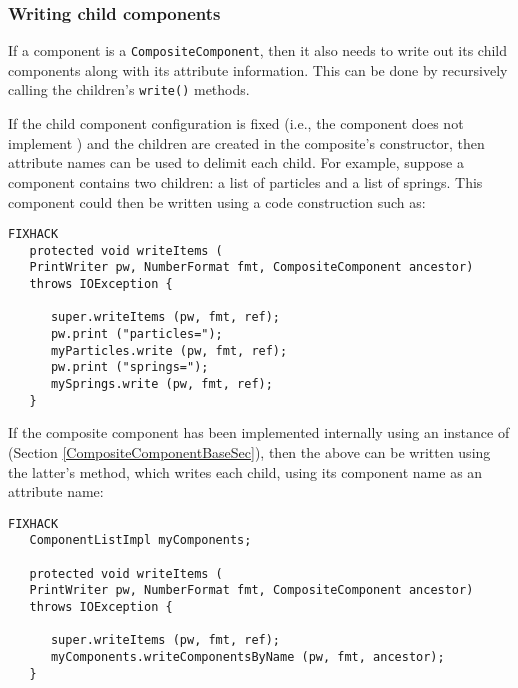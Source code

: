 \documentclass{article}
\begin{document}
\subsubsection{Writing child components}
\label{writingChildrenSec}

If a component is a {\tt CompositeComponent}, then it also needs to write
out its child components along with its attribute information. This
can be done by recursively calling the children's {\tt write()} methods.

If the child component configuration is fixed (i.e., the component
does not implement
)
and the children are created in the composite's constructor,
then attribute names can be used to delimit each child. For example, suppose
a component contains two children: a list of particles and a
list of springs. This component could then be written using
a code construction such as:
\begin{lstlisting}FIXHACK
   protected void writeItems (
   PrintWriter pw, NumberFormat fmt, CompositeComponent ancestor) 
   throws IOException {

      super.writeItems (pw, fmt, ref);
      pw.print ("particles=");
      myParticles.write (pw, fmt, ref);
      pw.print ("springs=");
      mySprings.write (pw, fmt, ref);
   }   
\end{lstlisting}
If the composite component has been implemented internally using
an instance of 
(Section \ref{CompositeComponentBaseSec}), then the
above can be written using the latter's
method, which writes each child, using its component name as an attribute name:
\begin{lstlisting}FIXHACK
   ComponentListImpl myComponents; 

   protected void writeItems (
   PrintWriter pw, NumberFormat fmt, CompositeComponent ancestor) 
   throws IOException {

      super.writeItems (pw, fmt, ref);
      myComponents.writeComponentsByName (pw, fmt, ancestor);
   }   
\end{lstlisting}
\end{document}
